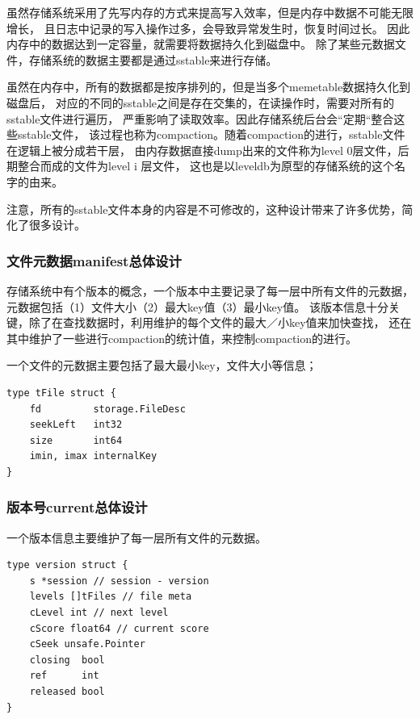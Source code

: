 		虽然存储系统采用了先写内存的方式来提高写入效率，但是内存中数据不可能无限增长，
		且日志中记录的写入操作过多，会导致异常发生时，恢复时间过长。
		因此内存中的数据达到一定容量，就需要将数据持久化到磁盘中。
		除了某些元数据文件，存储系统的数据主要都是通过sstable来进行存储。

		虽然在内存中，所有的数据都是按序排列的，但是当多个memetable数据持久化到磁盘后，
		对应的不同的sstable之间是存在交集的，在读操作时，需要对所有的sstable文件进行遍历，
		严重影响了读取效率。因此存储系统后台会“定期“整合这些sstable文件，
		该过程也称为compaction。随着compaction的进行，sstable文件在逻辑上被分成若干层，
		由内存数据直接dump出来的文件称为level 0层文件，后期整合而成的文件为level i 层文件，
		这也是以leveldb为原型的存储系统的这个名字的由来。

		注意，所有的sstable文件本身的内容是不可修改的，这种设计带来了许多优势，简化了很多设计。

		\subsubsection{文件元数据manifest总体设计}

		存储系统中有个版本的概念，一个版本中主要记录了每一层中所有文件的元数据，
		元数据包括（1）文件大小（2）最大key值（3）最小key值。
		该版本信息十分关键，除了在查找数据时，利用维护的每个文件的最大／小key值来加快查找，
		还在其中维护了一些进行compaction的统计值，来控制compaction的进行。

		一个文件的元数据主要包括了最大最小key，文件大小等信息；
		
		\begin{lstlisting}[caption=tFile , label=code_radds_storage_tfile]
type tFile struct {
    fd         storage.FileDesc
	seekLeft   int32
    size       int64
    imin, imax internalKey
}
		\end{lstlisting}

		\subsubsection{版本号current总体设计}

		一个版本信息主要维护了每一层所有文件的元数据。
		\begin{lstlisting}[caption=tFile , label=code_radds_storage_tfile]
type version struct {
    s *session // session - version
    levels []tFiles // file meta
    cLevel int // next level
    cScore float64 // current score
    cSeek unsafe.Pointer
    closing  bool
    ref      int
    released bool
}
		\end{lstlisting}

